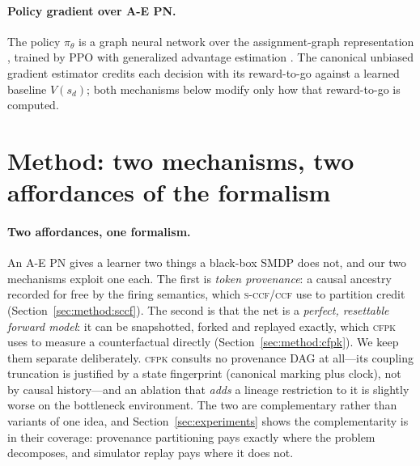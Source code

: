 \documentclass[review,authoryear,3p,times]{elsarticle}
\newcommand{\ccf}{\textsc{ccf}}
\newcommand{\sccf}{\textsc{s-ccf}}
\newcommand{\cfpk}{\textsc{cfpk}}
\begin{document}
\paragraph{Policy gradient over A-E PN.} The policy $\pi_\theta$ is a graph neural
network over the assignment-graph representation \citep{aepn_repr2025}, trained
by PPO \citep{ppo2017} with generalized advantage estimation \citep{gae2016}. The
canonical unbiased gradient estimator credits each decision with its
reward-to-go against a learned baseline $V(s_d)$; both mechanisms below modify
only how that reward-to-go is computed.

\section{Method: two mechanisms, two affordances of the formalism}
\label{sec:method}

\paragraph{Two affordances, one formalism.} An A-E PN gives a learner two
things a black-box SMDP does not, and our two mechanisms exploit one each.
The first is \emph{token provenance}: a causal ancestry recorded for free by
the firing semantics, which \sccf{}/\ccf{} use to partition credit
(Section~\ref{sec:method:sccf}). The second is that the net is a
\emph{perfect, resettable forward model}: it can be snapshotted, forked and
replayed exactly, which \cfpk{} uses to measure a counterfactual directly
(Section~\ref{sec:method:cfpk}). We keep them separate deliberately. \cfpk{}
consults no provenance DAG at all---its coupling truncation is justified by a
state fingerprint (canonical marking plus clock), not by causal history---and
an ablation that \emph{adds} a lineage restriction to it is slightly worse on
the bottleneck environment. The two are complementary rather than variants of
one idea, and Section~\ref{sec:experiments} shows the complementarity is in
their coverage: provenance partitioning pays exactly where the problem
decomposes, and simulator replay pays where it does not.
\end{document}

